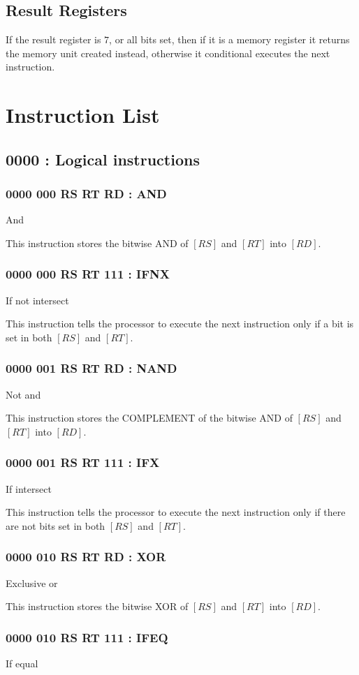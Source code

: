 \documentclass[12pt,letterpaper]{report}
\newcommand{\reg}[1]{\left[#1\right]}
\begin{document}
\subsection{Result Registers}
If the result register is $7$, or all bits set, then if it is a memory register it returns the memory unit created instead, otherwise it conditional executes the next instruction.
\section{Instruction List}
\subsection{0000 : Logical instructions}
\subsubsection{0000 000  RS  RT  RD : AND}
And

This instruction stores the bitwise AND of $\reg{RS}$ and $\reg{RT}$ into $\reg{RD}$.
\subsubsection{0000 000  RS  RT 111 : IFNX}
If not intersect

This instruction tells the processor to execute the next instruction only if a bit is set in both $\reg{RS}$ and $\reg{RT}$.
\subsubsection{0000 001  RS  RT  RD : NAND}
Not and

This instruction stores the COMPLEMENT of the bitwise AND of $\reg{RS}$ and $\reg{RT}$ into $\reg{RD}$.
\subsubsection{0000 001  RS  RT 111 : IFX}
If intersect

This instruction tells the processor to execute the next instruction only if there are not bits set in both $\reg{RS}$ and $\reg{RT}$.
\subsubsection{0000 010  RS  RT  RD : XOR}
Exclusive or

This instruction stores the bitwise XOR of $\reg{RS}$ and $\reg{RT}$ into $\reg{RD}$.
\subsubsection{0000 010  RS  RT 111 : IFEQ}
If equal
\end{document}

